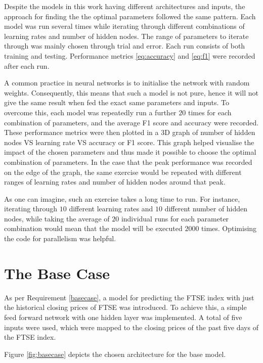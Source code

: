 \documentclass{UoYCSproject}
\begin{document}
Despite the models in this work having different architectures and inputs, the approach for finding the the optimal parameters followed the same pattern. Each model was run several times while iterating through different combinations of learning rates and number of hidden nodes. The range of parameters to iterate through was mainly chosen through trial and error. Each run consists of both training and testing. Performance metrics \ref{eq:accuracy} and \ref{eq:f1} were recorded after each run.

A common practice in neural networks is to initialise the network with random weights. Consequently, this means that such a model is not pure, hence it will not give the same result when fed the exact same parameters and inputs. To overcome this, each model was repeatedly run a further $20$ times for each combination of parameters, and the average F1 score and accuracy were recorded. These performance metrics were then plotted in a 3D graph of number of hidden nodes VS learning rate VS accuracy or F1 score. This graph helped visualise the impact of the chosen parameters and thus made it possible to choose the optimal combination of parameters. In the case that the peak performance was recorded on the edge of the graph, the same exercise would be repeated with different ranges of learning rates and number of hidden nodes around that peak.

As one can imagine, such an exercise takes a long time to run. For instance, iterating through $10$ different learning rates and $10$ different number of hidden nodes, while taking the average of $20$ individual runs for each parameter combination would mean that the model will be executed $2000$ times. Optimising the code for parallelism was helpful.  

\section{The Base Case}
\label{sec:thebasecase}
As per Requirement \ref{basecase}, a model for predicting the FTSE index with just the historical closing prices of FTSE was introduced.  To achieve this, a simple feed forward network with one hidden layer was implemented. A total of five inputs were used, which were mapped to the closing prices of the past five days of the FTSE index. 

Figure \ref{fig:basecase} depicts the chosen architecture for the base model. 
\end{document}
